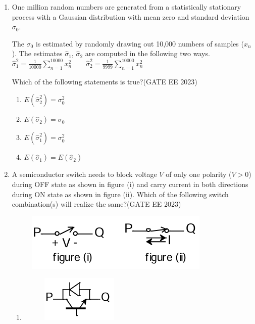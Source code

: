 \documentclass[a4paper,12pt]{exam}
\theoremstyle{remark}
\begin{document}
\begin{enumerate}
\item One million random numbers are generated from a statistically stationary process with a Gaussian distribution with mean zero and standard deviation $\sigma_0$. 

The $\sigma_0$ is estimated by randomly drawing out 10,000 numbers of samples ($x_n$). The estimates $\hat{\sigma}_1$, $\hat{\sigma}_2$ are computed in the following two ways.
$
\hat{\sigma}_1^2 = \frac{1}{10000} \sum_{n=1}^{10000} x_n^2
\qquad
\hat{\sigma}_2^2 = \frac{1}{9999} \sum_{n=1}^{10000} x_n^2
$

Which of the following statements is true?\hfill{(GATE EE 2023)}
\begin{multicols}{4}
\begin{enumerate}
    \item $E(\hat{\sigma}_2^2) = \sigma_0^2$
    \item $E(\hat{\sigma}_2) = \sigma_0$
    \item $E(\hat{\sigma}_1^2) = \sigma_0^2$
    \item $E(\hat{\sigma}_1) = E(\hat{\sigma}_2)$
\end{enumerate}
\end{multicols}
\item A semiconductor switch needs to block voltage $V$ of only one polarity ($V > 0$) during OFF state as shown in figure (i) and carry current in both directions during ON state as shown in figure (ii). Which of the following switch combination(s) will realize the same?\hfill{(GATE EE 2023)}
\begin{figure}[H]
    \centering
    \includegraphics[width=0.4\columnwidth]{figs/Q 26.png}
    \caption{}
    \label{fig:placeholder}
\end{figure}


\begin{multicols}{2}
\begin{enumerate}
    \item \begin{figure}[H]
    \centering
    \includegraphics[width=0.5\columnwidth]{figs/Q 26 1.png}
    

\end{figure}
\end{enumerate}
\end{multicols}
\end{enumerate}
\end{document}
